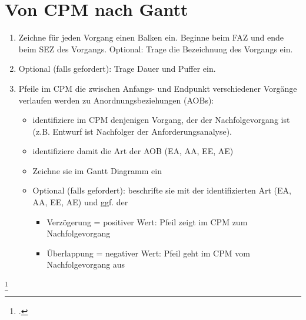 \documentclass{lehramt-informatik-haupt}
\begin{document}
%

\section{Von CPM nach Gantt}

\begin{enumerate}
\item Zeichne für jeden Vorgang einen Balken ein. Beginne beim FAZ und
ende beim SEZ des Vorgangs. Optional: Trage die Bezeichnung des Vorgangs
ein.

\item Optional (falls gefordert): Trage Dauer und Puffer ein.

\item Pfeile im CPM die zwischen Anfangs- und Endpunkt verschiedener
Vorgänge verlaufen werden zu Anordnungsbeziehungen (AOBs):

\begin{itemize}
\item identifiziere im CPM denjenigen Vorgang, der der Nachfolgevorgang
ist (z.B. Entwurf ist Nachfolger der Anforderungsanalyse).

\item identifiziere damit die Art der AOB (EA, AA, EE, AE)

\item Zeichne sie im Gantt Diagramm ein

\item Optional (falls gefordert): beschrifte sie mit der identifizierten
Art (EA, AA, EE, AE) und ggf. der

\begin{itemize}
\item Verzögerung = positiver Wert: Pfeil zeigt im CPM zum
Nachfolgevorgang

\item Überlappung = negativer Wert: Pfeil geht im CPM vom
Nachfolgevorgang aus
\end{itemize}
\end{itemize}
\end{enumerate}

\footcite[Seite 36]{sosy:fs:3}

\literatur
\end{document}
